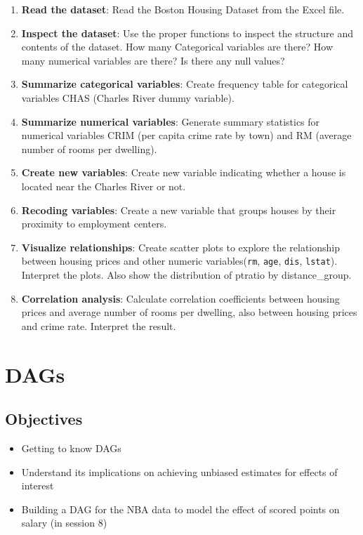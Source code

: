 \documentclass[
]{book}
\providecommand{\tightlist}{%
  \setlength{\itemsep}{0pt}\setlength{\parskip}{0pt}}
\begin{document}
\begin{enumerate}
\def\labelenumi{\arabic{enumi}.}
\item
  \textbf{Read the dataset}: Read the Boston Housing Dataset from the Excel file.
\item
  \textbf{Inspect the dataset}: Use the proper functions to inspect the structure and contents of the dataset. How many Categorical variables are there? How many numerical variables are there? Is there any null values?
\item
  \textbf{Summarize categorical variables}: Create frequency table for categorical variables CHAS (Charles River dummy variable).
\item
  \textbf{Summarize numerical variables}: Generate summary statistics for numerical variables CRIM (per capita crime rate by town) and RM (average number of rooms per dwelling).
\item
  \textbf{Create new variables}: Create new variable indicating whether a house is located near the Charles River or not.
\item
  \textbf{Recoding variables}: Create a new variable that groups houses by their proximity to employment centers.
\item
  \textbf{Visualize relationships}: Create scatter plots to explore the relationship between housing prices and other numeric variables(\texttt{rm}, \texttt{age}, \texttt{dis}, \texttt{lstat}). Interpret the plots. Also show the distribution of ptratio by distance\_group.
\item
  \textbf{Correlation analysis}: Calculate correlation coefficients between housing prices and average number of rooms per dwelling, also between housing prices and crime rate. Interpret the result.
\end{enumerate}

\hypertarget{dags-1}{%
\chapter{DAGs}\label{dags-1}}

\hypertarget{objectives-2}{%
\section{Objectives}\label{objectives-2}}

\begin{itemize}
\tightlist
\item
  Getting to know DAGs
\item
  Understand its implications on achieving unbiased estimates for effects of interest
\item
  Building a DAG for the NBA data to model the effect of scored points on salary (in session 8)
\end{itemize}
\end{document}
